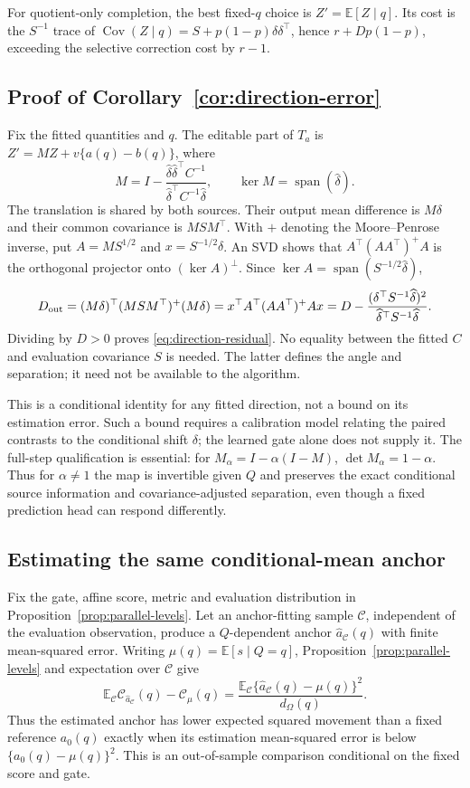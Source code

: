 \documentclass{article}
\theoremstyle{plain}
\theoremstyle{definition}
\newcommand{\E}{\mathbb E}
\DeclareMathOperator{\Cov}{Cov}
\begin{document}
For quotient-only completion, the best fixed-$q$ choice is
$Z'=\E[Z\mid q]$. Its cost is the $S^{-1}$ trace of
$\Cov(Z\mid q)=S+p(1-p)\delta\delta^\top$, hence
$r+Dp(1-p)$, exceeding the selective correction cost by $r-1$.

\subsection{Proof of Corollary~\ref{cor:direction-error}}
\label{app:direction-error}
Fix the fitted quantities and $q$. The editable part of $T_a$ is
$Z'=MZ+v\{a(q)-b(q)\}$, where
\[
 M=I-\frac{\widehat\delta\widehat\delta^\top C^{-1}}
 {\widehat\delta^\top C^{-1}\widehat\delta},
 \qquad \ker M=\operatorname{span}(\widehat\delta).
\]
The translation is shared by both sources. Their output mean difference is
$M\delta$ and their common covariance is $MSM^\top$. With $+$ denoting
the Moore--Penrose inverse, put $A=MS^{1/2}$ and $x=S^{-1/2}\delta$.
An SVD shows that $A^\top(AA^\top)^+A$ is the orthogonal projector onto
$(\ker A)^\perp$. Since
$\ker A=\operatorname{span}(S^{-1/2}\widehat\delta)$,
\[
 D_{\rm out}=(M\delta)^\top(MSM^\top)^+(M\delta)
 =x^\top A^\top(AA^\top)^+Ax
 =D-\frac{(\delta^\top S^{-1}\widehat\delta)^2}
 {\widehat\delta^\top S^{-1}\widehat\delta}.
\]
Dividing by $D>0$ proves \eqref{eq:direction-residual}. No equality between
the fitted $C$ and evaluation covariance $S$ is needed. The latter defines
the angle and separation; it need not be available to the algorithm.

This is a conditional identity for any fitted direction, not a bound on its
estimation error. Such a bound requires a calibration model relating the
paired contrasts to the conditional shift $\delta$; the learned gate alone
does not supply it. The full-step qualification is essential: for
$M_\alpha=I-\alpha(I-M)$, $\det M_\alpha=1-\alpha$. Thus for
$\alpha\ne1$ the map is invertible given $Q$ and preserves the exact
conditional source information and covariance-adjusted separation, even
though a fixed prediction head can respond differently.

\subsection{Estimating the same conditional-mean anchor}
\label{app:anchor-estimation}
Fix the gate, affine score, metric and evaluation distribution in
Proposition~\ref{prop:parallel-levels}. Let an anchor-fitting sample
$\mathcal C$, independent of the evaluation observation, produce a
$Q$-dependent anchor $\widehat a_{\mathcal C}(q)$ with finite mean-squared error.
Writing $\mu(q)=\E[s\mid Q=q]$, Proposition~\ref{prop:parallel-levels}
and expectation over $\mathcal C$ give
\begin{equation}
 \E_{\mathcal C}\mathcal C_{\widehat a_{\mathcal C}}(q)-\mathcal C_\mu(q)
 =\frac{\E_{\mathcal C}\{\widehat a_{\mathcal C}(q)-\mu(q)\}^2}{d_\Omega(q)}.
 \label{eq:anchor-risk}
\end{equation}
Thus the estimated anchor has lower expected squared movement than a fixed
reference $a_0(q)$ exactly when its estimation mean-squared error is below
$\{a_0(q)-\mu(q)\}^2$. This is an out-of-sample comparison conditional
on the fixed score and gate.
\end{document}
